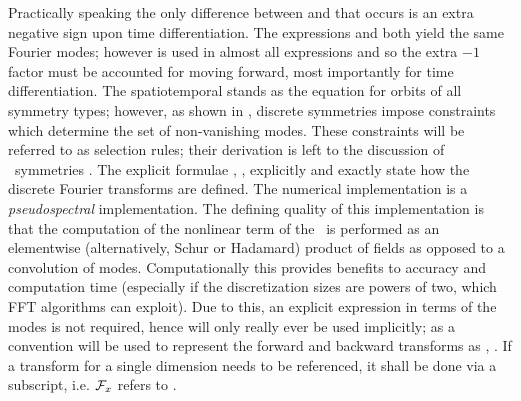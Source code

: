 Practically speaking the only difference between  and  that occurs is an extra
negative sign upon time differentiation.
The expressions  and  both yield the same Fourier modes; however \dufield is used in almost
all expressions and so the extra $-1$ factor must be accounted for moving forward, most importantly for time differentiation.
The spatiotemporal \rfft {} stands as the equation for orbits of all symmetry types;
however, as shown in , discrete symmetries impose constraints which determine the set of non-vanishing modes.
These constraints will be referred to as selection rules; their derivation is left to the discussion of
\spt\ symmetries .
The explicit formulae , ,  explicitly and exactly state how
the discrete Fourier transforms are defined. The numerical implementation is a \textit{pseudospectral} implementation. The defining
quality of this implementation is that the computation of the nonlinear term of the \KSe\
is performed as an elementwise (alternatively, Schur or Hadamard) product of fields as opposed to a convolution of modes.
Computationally this provides benefits to accuracy and computation time
(especially if the discretization sizes are powers of two, which FFT algorithms can exploit).
Due to this, an explicit expression in terms of the modes is not required,
hence \refeq{e-rfft} will only really ever be used implicitly; as a convention
will be used to represent the forward and backward transforms as \FFT, \IFFT.
If a transform for a single dimension needs to be referenced, it shall be
done via a subscript, i.e. $\mathcal{F}_x$ refers to \refeq{e-spacerfft}.

